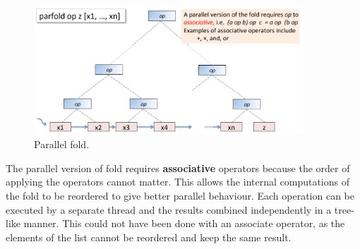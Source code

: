 \documentclass[CS4204-Notes.tex]{subfiles}
\begin{document}
\begin{figure}[H]
\centering
\includegraphics[width=0.9\textwidth, keepaspectratio]{imgs/parallel-fold.png}
\caption{Parallel fold.}
\end{figure}
\noindent
The parallel version of fold requires \textbf{associative} operators because the order of applying the operators cannot matter. This allows the internal computations of the fold to be reordered to give better parallel behaviour. Each operation can be executed by a separate thread and the results combined independently in a tree-like manner. This could not have been done with an associate operator, as the elements of the list cannot be reordered and keep the same result. 
\end{document}
